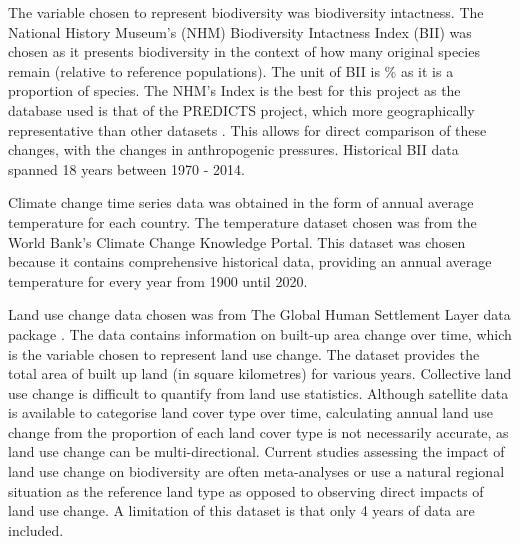 \documentclass[11pt, a4paper, titlepage]{article}
\begin{document}
	The variable chosen to represent biodiversity was biodiversity intactness. The National History Museum's (NHM) Biodiversity Intactness Index (BII)\citep{phillips2021} was chosen as it presents biodiversity in the context of how many original species remain (relative to reference populations). The unit of BII is \% as it is a proportion of species. The NHM's Index is the best for this project as the database used is that of the PREDICTS project, which more geographically representative than other datasets \citep{purvis2018modelling}. This allows for direct comparison of these changes, with the changes in anthropogenic pressures. Historical BII data spanned 18 years between 1970 - 2014. \newline
	
	Climate change time series data was obtained in the form of annual average temperature for each country. The temperature dataset chosen was from the World Bank's Climate Change Knowledge Portal. This dataset was chosen because it contains comprehensive historical data, providing an annual average temperature for every year from 1900 until 2020. \newline
	
	Land use change data chosen was from The Global Human Settlement Layer data package \citep{JRC117104}. The data contains information on built-up area change over time, which is the variable chosen to represent land use change. The dataset provides the total area of built up land (in square kilometres) for various years. Collective land use change is difficult to quantify from land use statistics. Although satellite data is available to categorise land cover type over time, calculating annual land use change from the proportion of each land cover type is not necessarily accurate, as land use change can be multi-directional. Current studies assessing the impact of land use change on biodiversity are often meta-analyses or use a natural regional situation as the reference land type \citep{de2013land} as opposed to observing direct impacts of land use change. A limitation of this dataset is that only 4 years of data are included. \newline
	
\end{document}
